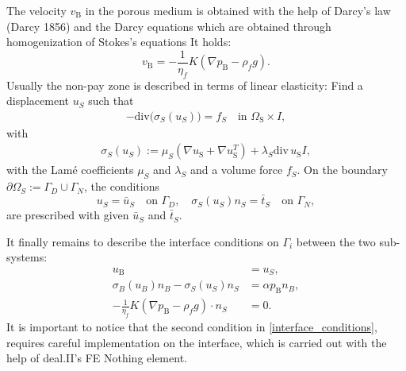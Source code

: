The velocity $v_{\text{B}}$ 
in the porous medium is obtained 
with the help of Darcy's law (Darcy 1856)
and the Darcy equations which are obtained 
through homogenization of Stokes's equations
It holds:
\begin{equation*}
v_{\text{B}} = -\frac{1}{\eta_f} K(\nabla p_{\text{B}} - \rho_f g).
\end{equation*}
Usually the non-pay zone is described 
in terms of linear elasticity: Find 
a displacement $u_S$ such that
\begin{align*}
- \text{div}\bigl( \sigma_S (u_S)  \bigr) = f_S \quad \text{in }\Omega_{\text{S}} \times I,
\end{align*}
with
\begin{align*}
\sigma_S (u_S) := \mu_S(\nabla u_{\text{S}} + \nabla u_{\text{S}}^T) +  
\lambda_S\text{div}\, u_{\text{S}}I, 
\end{align*}
with the Lam\'e coefficients $\mu_S$ and $\lambda_S$
and a volume force $f_S$. On the boundary 
$\partial\Omega_S := \Gamma_D \cup \Gamma_N$, the 
conditions
\begin{equation*}
u_S = \bar{u}_S \quad\text{on } \Gamma_D , \quad \sigma_S (u_S) n_S = \bar{t}_S \quad\text{on } \Gamma_N,
\end{equation*}
are prescribed with given $\bar{u}_S$ and $\bar{t}_S$.

It finally remains to describe the interface 
conditions on $\Gamma_{i}$ between the two sub-systems:
\begin{equation}
\label{interface_conditions}
\begin{aligned}
u_{\text{B}} &= u_S ,   \\
\sigma_{B}(u_B)n_B - \sigma_S(u_S)n_S &= 
\alpha p_{\text{B}} n_B  , \\
-\frac{1}{\eta_f} K(\nabla p_{\text{B}} - \rho_f g) \cdot n_S &= 0. 
\end{aligned} 
\end{equation}
It is important to notice that the second condition 
in \eqref{interface_conditions}, requires careful 
implementation on the interface, which is 
carried out with the help of deal.II's FE Nothing element.
